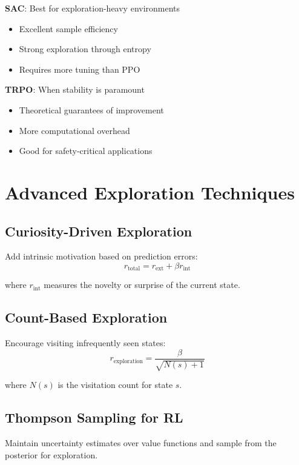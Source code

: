 \textbf{SAC}: Best for exploration-heavy environments
\begin{itemize}
    \item Excellent sample efficiency
    \item Strong exploration through entropy
    \item Requires more tuning than PPO
\end{itemize}

\textbf{TRPO}: When stability is paramount
\begin{itemize}
    \item Theoretical guarantees of improvement
    \item More computational overhead
    \item Good for safety-critical applications
\end{itemize}

\section{Advanced Exploration Techniques}

\subsection{Curiosity-Driven Exploration}

Add intrinsic motivation based on prediction errors:
\begin{equation}
r_{\text{total}} = r_{\text{ext}} + \beta r_{\text{int}}
\end{equation}

where $r_{\text{int}}$ measures the novelty or surprise of the current state.

\subsection{Count-Based Exploration}

Encourage visiting infrequently seen states:
\begin{equation}
r_{\text{exploration}} = \frac{\beta}{\sqrt{N(s) + 1}}
\end{equation}

where $N(s)$ is the visitation count for state $s$.

\subsection{Thompson Sampling for RL}

Maintain uncertainty estimates over value functions and sample from the posterior for exploration.


